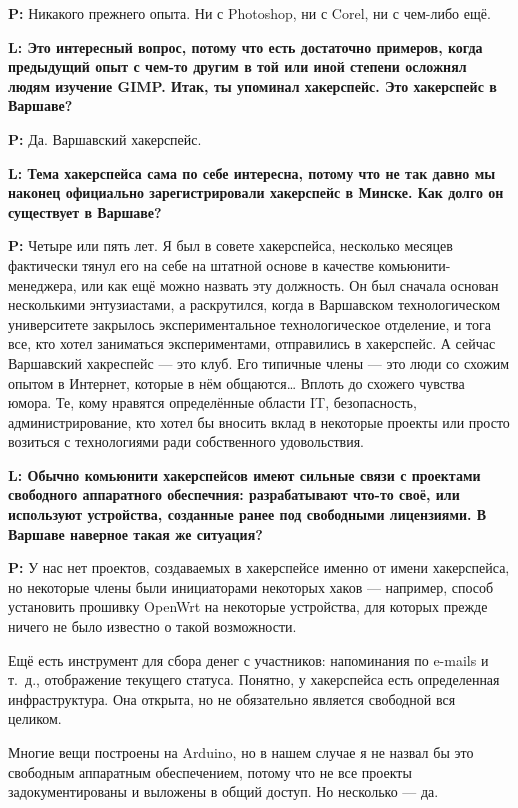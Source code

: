 \documentclass[10pt, a5paper]{article}
\begin{document}
\begin{Parallel}[p]{}{}
{{\noindent \bf P:}  Никакого прежнего опыта. Ни с Photoshop, ни с Corel, ни с чем-либо ещё.

{\noindent \bf L: Это интересный вопрос, потому что есть достаточно примеров, когда предыдущий опыт с чем-то другим в той или иной степени осложнял людям изучение GIMP. Итак, ты упоминал хакерспейс. Это хакерспейс в Варшаве?}

{\noindent \bf P:} Да. Варшавский хакерспейс. 

{\noindent \bf L: Тема хакерспейса сама по себе интересна, потому что не так давно мы наконец официально зарегистрировали хакерспейс в Минске. Как долго он существует в Варшаве?}

{\noindent \bf P:} Четыре или пять лет. Я был в совете хакерспейса, несколько  месяцев фактически тянул его на себе на штатной основе в качестве комьюнити-менеджера, или как ещё можно назвать эту должность. Он был сначала основан несколькими энтузиастами, а раскрутился, когда в Варшавском технологическом университете закрылось экспериментальное технологическое отделение, и тога все, кто хотел заниматься экспериментами, отправились в хакерспейс. А сейчас Варшавский хакреспейс --- это клуб. Его типичные члены --- это люди со схожим опытом в Интернет, которые в нём общаются… Вплоть до схожего чувства юмора. Те, кому нравятся определённые области IT, безопасность, администрирование, кто хотел бы вносить вклад в некоторые проекты или просто возиться с технологиями ради собственного удовольствия.

{\noindent \bf L: Обычно комьюнити хакерспейсов имеют сильные связи с проектами свободного аппаратного обеспечния: разрабатывают что-то своё, или используют устройства, созданные ранее под свободными лицензиями. В Варшаве наверное такая же ситуация?}

{\noindent \bf P:} У нас нет проектов, создаваемых в хакерспейсе именно от имени хакерспейса, но некоторые члены были инициаторами некоторых хаков --- например, способ установить прошивку OpenWrt на некоторые устройства, для которых прежде ничего не было известно о такой возможности.

Ещё есть инструмент для сбора денег с участников: напоминания по e-mails и т.~д., отображение текущего статуса. Понятно, у хакерспейса есть определенная инфраструктура. Она открыта, но не обязательно является свободной вся целиком. 
 
Многие вещи построены на Arduino, но в нашем случае я не назвал бы это свободным аппаратным обеспечением, потому что не все проекты задокументированы и выложены в общий доступ. Но несколько --- да.

}
\end{Parallel}
\end{document}
